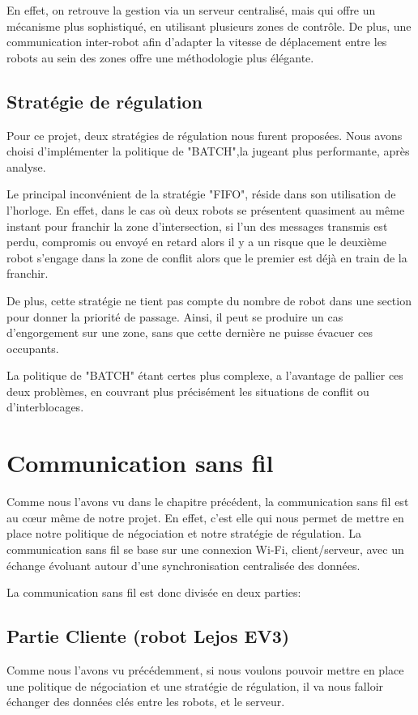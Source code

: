 \documentclass[french,a4paper,12pt]{report}
\begin{document}
En effet, on retrouve la gestion via un serveur centralisé, mais qui offre un mécanisme plus sophistiqué, en utilisant plusieurs zones de contrôle. De plus, une communication inter-robot afin d'adapter la vitesse de déplacement entre les robots au sein des zones offre une méthodologie plus élégante.

\section{Stratégie de régulation}
Pour ce projet, deux stratégies de régulation nous furent proposées.
Nous avons choisi d'implémenter la politique de "BATCH",la jugeant plus performante, après analyse.

Le principal inconvénient de la stratégie "FIFO", réside dans son utilisation de l'horloge.
En effet, dans le cas où deux robots se présentent quasiment au même instant pour franchir la zone d'intersection, si l'un des messages transmis est perdu, compromis ou envoyé en retard alors il y a un risque que le deuxième robot s'engage dans la zone de conflit alors que le premier est déjà en train de la franchir.

De plus, cette stratégie ne tient pas compte du nombre de robot dans une section pour donner la priorité de passage. Ainsi, il peut se produire un cas d'engorgement sur une zone, sans que cette dernière ne puisse évacuer ces occupants.

La politique de "BATCH" étant certes plus complexe, a l'avantage de pallier ces deux problèmes, en couvrant plus précisément les situations de conflit ou d'interblocages.

\chapter{Communication sans fil}
Comme nous l'avons vu dans le chapitre précédent, la communication sans fil est au cœur même de notre projet. En effet, c'est elle qui nous permet de mettre en place notre politique de négociation et notre stratégie de régulation.
La communication sans fil se base sur une connexion Wi-Fi, client/serveur, avec un échange évoluant autour d'une synchronisation centralisée des données.

La communication sans fil est donc divisée en deux parties:

\section{Partie Cliente (robot Lejos EV3)}%
Comme nous l'avons vu précédemment, si nous voulons pouvoir mettre en place une politique de négociation et une stratégie de régulation, il va nous falloir échanger des données clés entre les robots, et le serveur.
\end{document}
